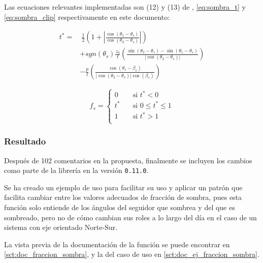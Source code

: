 Las ecuaciones relevantes implementadas son (12) y (13) de \cite{Anderson_Jensen_2024}, \ref{eq:sombra_t} y \ref{eq:sombra_clip} respectivamente en este documento:

\begin{equation} \label{eq:sombra_t}
    \begin{aligned}
        t^* = & \ \frac{1}{2} \left( 1 + \left|\frac{\cos(\theta_1 - \theta_s)}{\cos(\theta_2 - \theta_s)}\right| \right)                                            \\
              & + sgn(\theta_s) \frac{z_0}{\ell} \left( \frac{\sin(\theta_2 - \theta_s) - \sin(\theta_1 - \theta_s)}{\left|\cos(\theta_2 - \theta_s)\right|} \right) \\
              & - \frac{p}{\ell} \left( \frac{\cos(\theta_s - \beta_c)}{\left|\cos(\theta_2 - \theta_s)\right| \cos(\beta_c)} \right)
    \end{aligned}
\end{equation}

\begin{equation} \label{eq:sombra_clip}
    f_s =
    \begin{cases}
        0   & \quad \text{si } t^* < 0           \\
        t^* & \quad \text{si } 0 \leq t^* \leq 1 \\
        1   & \quad \text{si } t^* > 1           \\
    \end{cases}
\end{equation}

\subsubsection{Resultado}

Después de 102 comentarios en la propuesta, finalmente se incluyen los cambios como parte de la librería en la versión \texttt{0.11.0}.

Se ha creado un ejemplo de uso para facilitar su uso y aplicar un patrón que facilita cambiar entre los valores adecuados de fracción de \gls{sombra}, pues esta función solo entiende de los ángulos del seguidor que sombrea y del que es sombreado, pero no de cómo cambian sus roles a lo largo del día en el caso de un sistema con eje orientado Norte-Sur.

La vista previa de la documentación de la función se puede encontrar en \ref{sct:doc_fraccion_sombra}, y la del caso de uso en \ref{sct:doc_ej_fraccion_sombra}.

